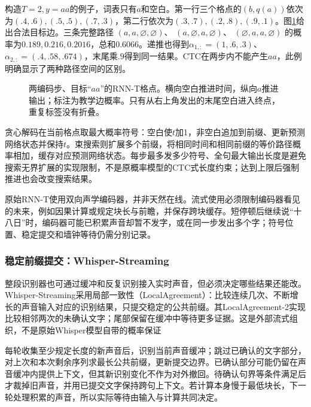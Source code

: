 构造$T=2,y=aa$的例子，词表只有$a$和空白。第一行三个格点的$(b,q(a))$依次为$(.4,.6),(.5,.5),(.7,.3)$，第二行依次为$(.3,.7),(.2,.8),(.9,.1)$。图\ref{fig:nlp-speech-rnnt-lattice}给出合法目标边。三条完整路径
$(a,a,\varnothing,\varnothing)$、
$(a,\varnothing,a,\varnothing)$、
$(\varnothing,a,a,\varnothing)$
的概率为$0.189,0.216,0.2016$，总和$0.6066$。递推也得到$\alpha_{1,:}=(1,.6,.3)$、$\alpha_{2,:}=(.4,.58,.674)$，末尾乘$.9$得到同一结果。CTC在两步内不能产生$aa$，此例明确显示了两种路径空间的区别。

\begin{figure}[htbp]
  \centering
  
  \caption{两编码步、目标“$aa$”的RNN-T格点。横向空白推进时间，纵向$a$推进输出；标注为教学边概率。只有从右上角发出的末尾空白进入终点，重复标签没有折叠。}
  \label{fig:nlp-speech-rnnt-lattice}
\end{figure}
\FloatBarrier

贪心解码在当前格点取最大概率符号：空白使$t$加1，非空白追加到前缀、更新预测网络状态并保持$t$。束搜索则扩展多个前缀，将相同时间和相同前缀的等价路径概率相加，缓存对应预测网络状态。每步最多发多少符号、全句最大输出长度是避免搜索无界扩展的实现限制，不是原概率模型的CTC式长度约束；达到上限后强制推进也会改变搜索结果。

原始RNN-T使用双向声学编码器，并非天然在线。流式使用必须限制编码器看见的未来，例如因果计算或规定块长与前瞻，并保存跨块缓存。短停顿后继续说“十八日”时，编码器可能已积累声音却暂不发字，或在同一步发出多个字；符号位置、稳定提交和墙钟等待仍需分别记录。

\subsubsection{稳定前缀提交：Whisper-Streaming}
\label{sec:nlp-speech-whisper-streaming}

整段识别器也可通过缓冲和反复识别接入实时声音，但必须决定哪些结果还能改。Whisper-Streaming采用局部一致性（LocalAgreement）：比较连续几次、不断增长的声音输入对应的识别结果，只提交稳定的公共前缀。其LocalAgreement-2实现比较相邻两次的未确认文字；尾部保留在缓冲中等待更多证据。这是外部流式组织，不是原始Whisper模型自带的概率保证

每轮收集至少规定长度的新声音后，识别当前声音缓冲；跳过已确认的文字部分，对上次和本次剩余序列求最长公共前缀，更新提交边界。已确认部分可能仍留在声音缓冲内提供上下文，但其新识别变化不作为对外撤回。待确认句界等条件满足后才裁掉旧声音，并用已提交文字保持跨句上下文。若计算本身慢于最低块长，下一轮处理积累的声音，所以实际等待由输入与计算共同决定。

